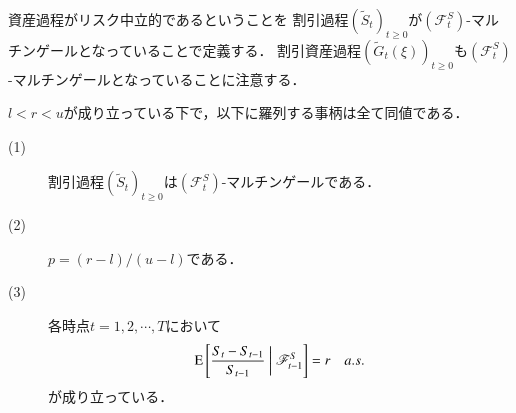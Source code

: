 \begin{dfn}[リスク中立]
	資産過程がリスク中立的であるということを
	割引過程$\left(\tilde{S}_t\right)_{t \geq 0}$が$(\mathscr{F}_t^S)$-マルチンゲールとなっていることで定義する．
	割引資産過程$\left(\tilde{G}_t(\xi)\right)_{t \geq 0}$も$(\mathscr{F}_t^S)$-マルチンゲールとなっていることに注意する．
\end{dfn}

\begin{prp}[リスク中立的であることの同値条件]
	$l < r < u$が成り立っている下で，以下に羅列する事柄は全て同値である．
	\begin{description}
		\item[(1)] 割引過程$\left(\tilde{S}_t\right)_{t \geq 0}$は$(\mathscr{F}_t^S)$-マルチンゲールである．
		\item[(2)] $p = (r - l)/(u - l)$である．
		\item[(3)] 各時点$t = 1,2,\cdots,T$において
			\begin{align}
				\operatorname{E} \left[ \frac{S_t - S_{t-1}}{S_{t-1}} \ \middle|\ \mathscr{F}_{t-1}^S \right] = r \quad a.s.
			\end{align}
			が成り立っている．
	\end{description}
\end{prp}

